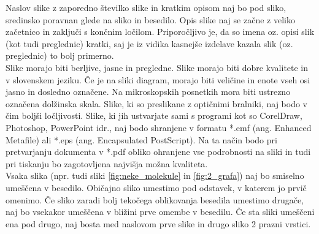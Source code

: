 Naslov slike z zaporedno številko slike in kratkim opisom naj bo pod sliko, sredinsko poravnan glede na sliko in besedilo. Opis slike naj se začne z veliko začetnico in zaključi s končnim ločilom. Priporočljivo je, da so imena oz. opisi slik (kot tudi preglednic) kratki, saj je iz vidika kasnejše izdelave kazala slik (oz. preglednic) to bolj primerno.\\

Slike morajo biti berljive, jasne in pregledne. Slike morajo biti dobre kvalitete in v slovenskem jeziku. Če je na sliki diagram, morajo biti veličine in enote vseh osi jasno in dosledno označene. Na mikroskopskih posnetkih mora biti ustrezno označena dolžinska skala. Slike, ki so preslikane z optičnimi bralniki, naj bodo v čim boljši ločljivosti. Slike, ki jih ustvarjate sami s programi kot so CorelDraw, Photoshop, PowerPoint idr., naj bodo shranjene v formatu *.emf (ang. Enhanced Metafile) ali *.eps (ang. Encapsulated PostScript). Na ta način bodo pri pretvarjanju dokumenta v *.pdf obliko ohranjene vse podrobnosti na sliki in tudi pri tiskanju bo zagotovljena najvišja možna kvaliteta.\\
	
Vsaka slika (npr. tudi sliki \ref{fig:neke_molekule} in \ref{fig:2_grafa}) naj bo smiselno umeščena v besedilo. Običajno sliko umestimo pod odstavek, v katerem jo prvič omenimo. Če sliko zaradi bolj tekočega oblikovanja besedila umestimo drugače, naj bo vsekakor umeščena v bližini prve omembe v besedilu. Če sta sliki umeščeni ena pod drugo, naj bosta med naslovom prve slike in drugo sliko 2 prazni vrstici.\\

